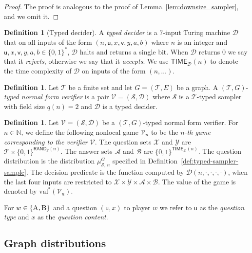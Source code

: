 \documentclass[11pt]{article}
\theoremstyle{definition}
\newtheorem{definition}[theorem]{Definition}
\newcommand{\N}{\ensuremath{\mathbb{N}}}
\newcommand{\val}{\ensuremath{\mathrm{val}}}
\newcommand{\sampler}{\mathcal{S}}
\newcommand{\decider}{\mathcal{D}}
\newcommand{\verifier}{\mathcal{V}}
\newcommand{\type}{\mathcal{T}}
\newcommand{\labelstyle}[1]{\ensuremath{\textsc{#1}}\xspace}
\newcommand{\tvarstyle}[1]{\mathsf{#1}}
\newcommand{\lvar}{\ensuremath{\tvarstyle{u}}}
\newcommand{\rvar}{\ensuremath{\tvarstyle{v}}}
\newcommand{\alice}{\labelstyle{A}}
\newcommand{\bob}{\labelstyle{B}}
\renewcommand{\cal}[1]{\mathcal{#1}}
\newcommand{\TIME}{\mathsf{TIME}}
\newcommand{\RAND}{\mathsf{RAND}}
\begin{document}
\begin{proof}
  The proof is analogous to the proof of Lemma~\ref{lem:downsize_sampler}, and
  we omit it.
\end{proof}

\begin{definition}[Typed decider]
  \label{def:typed-decider}
  A \emph{typed decider} is a $7$-input Turing machine $\decider$ that on all
  inputs of the form $(n,\lvar,x,\rvar,y,a,b)$ where $n$ is an integer and
  $\lvar,x,\rvar,y,a,b \in \{0,1\}^*$, $\decider$ halts and returns a single
  bit.
  When $\decider$ returns $0$ we say that it \emph{rejects}, otherwise we say
  that it \emph{accepts}.
  We use $\TIME_\decider(n)$ to denote the time complexity of $\decider$ on
  inputs of the form $(n,\ldots)$.
\end{definition}

\begin{definition}
  \label{def:typed-normal-ver}
  Let $\type$ be a finite set and let $G = (\type, E)$ be a graph.
  A $(\type, G)$-\emph{typed normal form verifier} is a pair $\verifier =
  (\sampler, \decider)$ where $\sampler$ is a $\type$-typed sampler with field
  size $q(n) = 2$ and $\decider$ is a typed decider.
\end{definition}

\begin{definition}
  \label{def:typed-normal-game}
  Let $\verifier = (\sampler, \decider)$ be a $(\type, G)$-typed normal form
  verifier.
  For $n \in \N$, we define the following nonlocal game $\verifier_{n}$ to be
  the \emph{$n$-th game corresponding to the verifier $\verifier$}.
  The question sets $\cal{X}$ and $\cal{Y}$ are $\type \times
  \{0,1\}^{\RAND_\sampler(n)}$.
  The answer sets $\cal{A}$ and $\cal{B}$ are $\{0,1\}^{\TIME_\decider(n)}$.
  The question distribution is the distribution $\mu^G_{\sampler,\, n}$
  specified in Definition~\ref{def:typed-sampler-sample}.
  The decision predicate is the function computed by
  $\decider(n,\cdot,\cdot,\cdot,\cdot)$, when the last four inputs are
  restricted to $\cal{X}\times \cal{Y}\times\cal{A}\times\cal{B}$.
  The value of the game is denoted by $\val^*(\verifier_{n})$.  
\end{definition}

For $w\in\{\alice,\bob\}$ and a question $(\lvar, x)$ to player $w$ we refer to
$\lvar$ as the \emph{question type} and $x$ as the \emph{question content}.

\subsection{Graph distributions}
\label{sec:graph-dist}
\end{document}
